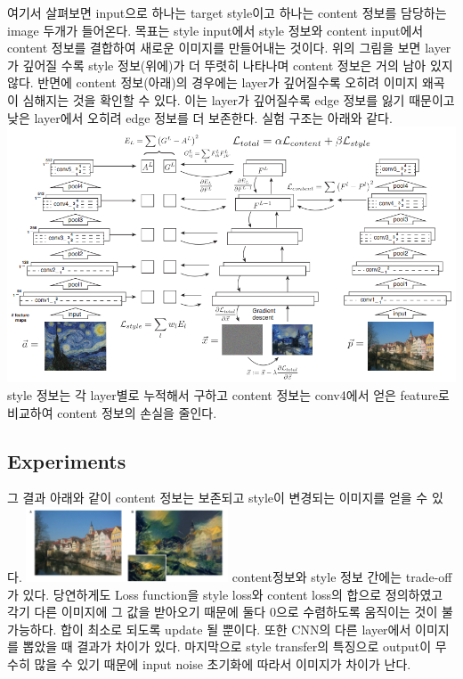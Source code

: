 \documentclass[extendedabs]{bmvc2k}
\begin{document}
여기서 살펴보면 input으로 하나는 target style이고 하나는 content 정보를 담당하는 image 두개가 들어온다. 목표는 style input에서 style 정보와 
content input에서 content 정보를 결합하여 새로운 이미지를 만들어내는 것이다. 위의 그림을 보면 layer가 깊어질 수록 style 정보(위에)가 더 뚜렷히 나타나며 content 정보은 거의 남아 있지 않다.
반면에 content 정보(아래)의 경우에는 layer가 깊어질수록 오히려 이미지 왜곡이 심해지는 것을 확인할 수 있다. 이는 layer가 깊어질수록 edge 정보를 잃기 때문이고 낮은 layer에서 오히려 edge 정보를
더 보존한다. 실험 구조는 아래와 같다. 
\newline  \includegraphics[width=\linewidth]{images/05_style.PNG}
style 정보는 각 layer별로 누적해서 구하고 content 정보는 conv4에서 얻은 feature로 비교하여 content 정보의 손실을 줄인다.

\subsection{Experiments}
\quad 그 결과 아래와 같이 content 정보는 보존되고 style이 변경되는 이미지를 얻을 수 있다.
\newline  \includegraphics[width=6cm]{images/06_style.PNG}
\newline content정보와 style 정보 간에는 trade-off가 있다. 당연하게도 Loss function을 style loss와 content loss의 합으로 정의하였고 각기 다른 이미지에 
그 값을 받아오기 때문에 둘다 0으로 수렴하도록 움직이는 것이 불가능하다. 합이 최소로 되도록 update 될 뿐이다. 또한 CNN의 다른 layer에서 이미지를 뽑았을 때 결과가 차이가 있다.
마지막으로 style transfer의 특징으로 output이 무수히 많을 수 있기 때문에 input noise 초기화에 따라서 이미지가 차이가 난다.
\end{document}
